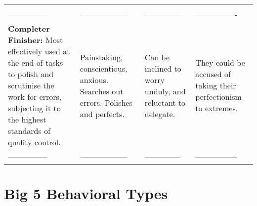 \documentclass[]{book}
\begin{document}
\begin{longtable}[]{@{}llll@{}}
\begin{minipage}[t]{0.22\columnwidth}
\end{minipage}\tabularnewline
\begin{minipage}[t]{0.21\columnwidth}\raggedright
---------------\strut
\end{minipage} & \begin{minipage}[t]{0.25\columnwidth}\raggedright
------------------\strut
\end{minipage} & \begin{minipage}[t]{0.20\columnwidth}\raggedright
--------------\strut
\end{minipage} & \begin{minipage}[t]{0.22\columnwidth}\raggedright
----------------\strut
\end{minipage}\tabularnewline
\begin{minipage}[t]{0.21\columnwidth}\raggedright
\textbf{Completer Finisher:} Most effectively used at the end of tasks to polish and scrutinise the work for errors, subjecting it to the highest standards of quality control.\strut
\end{minipage} & \begin{minipage}[t]{0.25\columnwidth}\raggedright
Painstaking, conscientious, anxious. Searches out errors. Polishes and perfects.\strut
\end{minipage} & \begin{minipage}[t]{0.20\columnwidth}\raggedright
Can be inclined to worry unduly, and reluctant to delegate.\strut
\end{minipage} & \begin{minipage}[t]{0.22\columnwidth}\raggedright
They could be accused of taking their perfectionism to extremes.\strut
\end{minipage}\tabularnewline
\begin{minipage}[t]{0.21\columnwidth}\raggedright
---------------\strut
\end{minipage} & \begin{minipage}[t]{0.25\columnwidth}\raggedright
------------------\strut
\end{minipage} & \begin{minipage}[t]{0.20\columnwidth}\raggedright
--------------\strut
\end{minipage} & \begin{minipage}[t]{0.22\columnwidth}\raggedright
----------------\strut
\end{minipage}\tabularnewline
\bottomrule
\end{longtable}

\hypertarget{big-5-behavioral-types}{%
\section{Big 5 Behavioral Types}\label{big-5-behavioral-types}}
\end{document}
